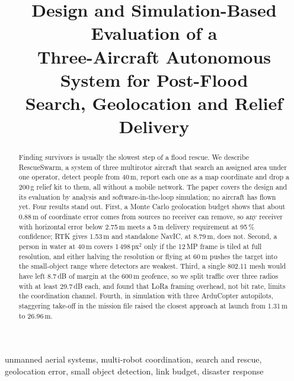 \documentclass[conference]{IEEEtran}
\begin{document}
\title{Design and Simulation-Based Evaluation of a\\
Three-Aircraft Autonomous System for Post-Flood\\
Search, Geolocation and Relief Delivery}

\author{
}

\maketitle

\begin{abstract}
Finding survivors is usually the slowest step of a flood rescue. We describe
RescueSwarm, a system of three multirotor aircraft that search an assigned area
under one operator, detect people from 40\,m, report each one as a map
coordinate and drop a 200\,g relief kit to them, all without a mobile network.
The paper covers the design and its evaluation by analysis and
software-in-the-loop simulation; no aircraft has flown yet. Four results stand
out. First, a Monte Carlo geolocation budget shows that about 0.88\,m of
coordinate error comes from sources no receiver can remove, so any receiver with
horizontal error below 2.75\,m meets a 5\,m delivery requirement at 95\,\%
confidence; RTK gives 1.53\,m and standalone NavIC, at 8.79\,m, does not. Second,
a person in water at 40\,m covers 1\,498\,px$^2$ only if the 12\,MP frame is
tiled at full resolution, and either halving the resolution or flying at 60\,m
pushes the target into the small-object range where detectors are weakest.
Third, a single 802.11 mesh would have left 8.7\,dB of margin at the 600\,m
geofence, so we split traffic over three radios with at least 29.7\,dB each,
and found that LoRa framing overhead, not bit rate, limits the coordination
channel. Fourth, in simulation with three ArduCopter autopilots, staggering
take-off in the mission file raised the closest approach at launch from 1.31\,m
to 26.96\,m.
\end{abstract}

\begin{IEEEkeywords}
unmanned aerial systems, multi-robot coordination, search and rescue,
geolocation error, small object detection, link budget, disaster response
\end{IEEEkeywords}
\end{document}
